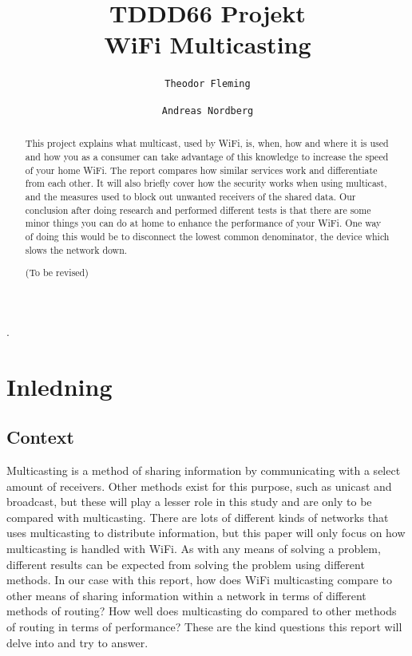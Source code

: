 \documentclass[9pt,a4paper]{acmproc}
\author{
  \texttt{Theodor Fleming}
  \and
  \texttt{Andreas Nordberg}
}
\begin{document}

\title{%
	TDDD66 Projekt \\
	\large WiFi Multicasting}
\maketitle

\clearpage
.
\clearpage

\begin{abstract}
This project explains what multicast, used by WiFi, is, when, how and where it is used and how you as a consumer can take advantage of this knowledge to increase the speed of your home WiFi. The report compares how similar services work and differentiate from each other. It will also briefly cover how the security works when using multicast, and the measures used to block out unwanted receivers of the shared data.
Our conclusion after doing research and performed different tests is that there are some minor things you can do at home to enhance the performance of your WiFi. One way of doing this would be to disconnect the lowest common denominator, the device which slows the network down. 

(To be revised)
\end{abstract}

\clearpage

\section{Inledning}

\subsection{Context}

Multicasting is a method of sharing information by communicating with a select amount of receivers. Other methods exist for this purpose, such as unicast and broadcast, but these will play a lesser role in this study and are only to be compared with multicasting. There are lots of different kinds of networks that uses multicasting to distribute information, but this paper will only focus on how multicasting is handled with WiFi. As with any means of solving a problem, different results can be expected from solving the problem using different methods. In our case with this report, how does WiFi multicasting compare to other means of sharing information within a network in terms of different methods of routing? How well does multicasting do compared to other methods of routing in terms of performance? These are the kind questions this report will delve into and try to answer.  
\end{document}
